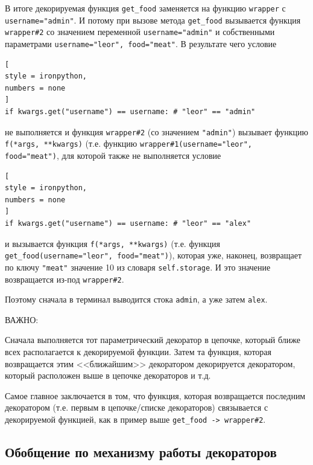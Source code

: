 \documentclass[%
	11pt,
	a4paper,
	utf8,
		]{article}
\begin{document}
В итоге декорируемая функция \texttt{get\_food} заменяется на функцию \texttt{wrapper} с \texttt{username="admin"}. И потому при вызове метода \texttt{get\_food} вызывается функция \verb|wrapper#2| со значением переменной \texttt{username="admin"} и собственными параметрами \verb|username="leor", food="meat"|. В результате чего условие
\begin{lstlisting}[
style = ironpython,
numbers = none	
]
if kwargs.get("username") == username: # "leor" == "admin"
\end{lstlisting}
не выполняется и функция \verb|wrapper#2| (со значением \texttt{"admin"}) вызывает функцию \verb|f(*args, **kwargs)| (т.е. функцию \verb|wrapper#1(username="leor", food="meat")|, для которой также не выполняется условие
\begin{lstlisting}[
style = ironpython,
numbers = none	
]
if kwargs.get("username") == username: # "leor" == "alex"
\end{lstlisting}
и вызывается функция \texttt{f(*args, **kwargs)} (т.е. функция \verb|get_food(username="leor", food="meat")|), которая уже, наконец, возвращает по ключу \texttt{"meat"} значение 10 из словаря \texttt{self.storage}. И это значение возвращается из-под \verb|wrapper#2|.

Поэтому сначала в терминал выводится стока \texttt{admin}, а уже затем \texttt{alex}.

ВАЖНО: {\color{remarkcolor} Сначала выполняется тот параметрический декоратор в цепочке, который ближе всех располагается к декорируемой функции. Затем та функция, которая возвращается этим <<ближайшим>> декоратором декорируется декоратором, который расположен выше в цепочке декораторов и т.д.
	
Самое главное заключается в том, что функция, которая возвращается последним декоратором (т.е. первым в цепочке/списке декораторов) связывается с декорируемой функцией, как в пример выше \verb|get_food -> wrapper#2|.}





\subsection{Обобщение по механизму работы декораторов}
\end{document}
